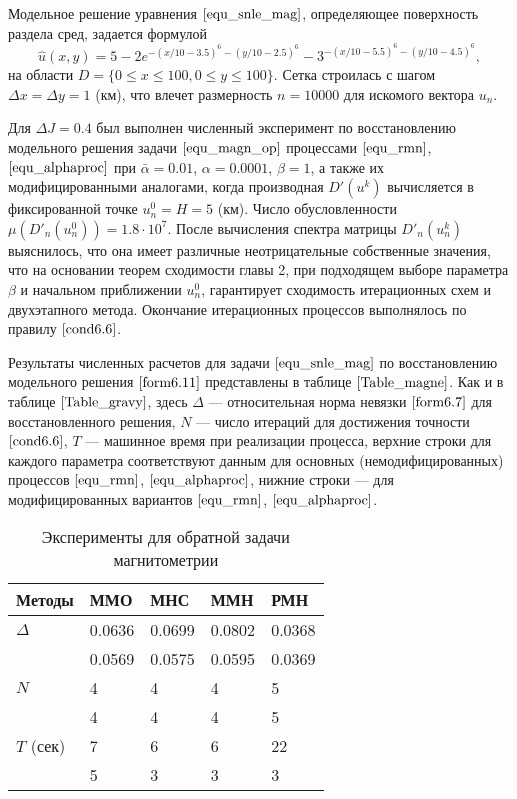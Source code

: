 Модельное решение уравнения $\eqref{equ_snle_mag}$, определяющее поверхность раздела сред, задается формулой \cite{AkMisDer2014}
\begin{equation}\label{form6.11}
\hat{u}(x,y)=5-2e^{-(x/10-3.5)^6-(y/10-2.5)^6}-
3^{-(x/10-5.5)^6-(y/10-4.5)^6},
\end{equation}
на области $D=\{0\le x \le 100, 0\le y\le 100\}$. Сетка строилась с шагом $\Delta x=\Delta y = 1$ (км), что влечет размерность $n=10000$ для искомого вектора $u_n$.

Для $\Delta J=0.4$  был выполнен численный эксперимент по восстановлению модельного решения задачи $\eqref{equ_magn_op}$ процессами $\eqref{equ_rmn}$, $\eqref{equ_alphaproc}$ при $\bar\alpha=0.01$, $\alpha = 0.0001$, $\beta=1$, а также их модифицированными аналогами, когда производная $D'(u^k)$ вычисляется в фиксированной точке $u_n^0=H=5$ (км). Число обусловленности $\mu(D'_n(u_n^0))=1.8\cdot 10^7$. После вычисления спектра матрицы $D'_n(u_n^k)$ выяснилось, что она имеет различные неотрицательные собственные значения, что на основании теорем сходимости главы 2, при подходящем выборе параметра $\beta$ и начальном приближении $u_n^0$, гарантирует сходимость итерационных схем и двухэтапного метода. Окончание итерационных процессов выполнялось по правилу $\eqref{cond6.6}$.

Результаты численных расчетов для задачи $\eqref{equ_snle_mag}$ по восстановлению модельного решения $\eqref{form6.11}$ представлены в таблице $\ref{Table_magne}$. Как и в таблице $\ref{Table_gravy}$, здесь $\Delta$ --- относительная норма невязки $\eqref{form6.7}$ для восстановленного решения, $N$ --- число итераций для достижения точности $\eqref{cond6.6}$, $T$ --- машинное время при реализации процесса, верхние строки для каждого параметра соответствуют данным для основных (немодифицированных) процессов $\eqref{equ_rmn}$, $\eqref{equ_alphaproc}$, нижние строки --- для модифицированных вариантов $\eqref{equ_rmn}$, $\eqref{equ_alphaproc}$.
\begin{table}[H]
	\centering
	\caption{Эксперименты для обратной задачи магнитометрии}
	\label{Table_magne}
	\begin{tabular}{|p{}|p{}|p{}|p{}|p{}|}
		\hline
		\rule{0cm}{0.5cm}
		\textbf{Методы} & \textbf{ММО} & \textbf{МНС} & \textbf{ММН} & \textbf{РМН} \\ \hline
		\rule{0cm}{0.5cm}
		{$\Delta$} & 0.0636 & 0.0699 & 0.0802 & 0.0368	 \\ \cline{2-5} 
		\rule{0cm}{0.5cm}
		&  0.0569   & 0.0575    &  0.0595   &  0.0369   \\ \hline
		\rule{0cm}{0.5cm}
		{$N$} & 4  &  4   &   4  &  5    \\ \cline{2-5}
		\rule{0cm}{0.5cm}
		&  4   &   4  &  4   &  5   \\ \hline
		\rule{0cm}{0.5cm}
		{$T$ (сек)}    &  7   &  6   &  6  & 22    \\ \cline{2-5}
		\rule{0cm}{0.5cm}
		& 5    & 3    &  3   &   3  \\ \hline
	\end{tabular}
\end{table}

